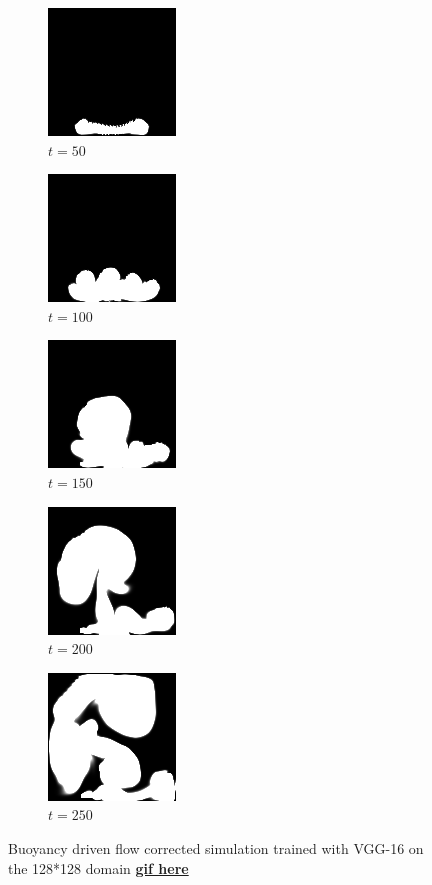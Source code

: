 \documentclass[a4paper,12pt,twoside]{report}
\begin{document}
\begin{figure}
	\centering
	\begin{subfigure}{0.18\textwidth}
		\centering
		\includegraphics[scale=0.56]{buoyancy_test/dens_000050_vgg.png}
		\caption{$t=50$}
	\end{subfigure}
	\begin{subfigure}{0.18\textwidth}
		\centering
		\includegraphics[scale=0.56]{buoyancy_test/dens_000100_vgg.png}
		\caption{$t=100$}
	\end{subfigure}
	\begin{subfigure}{0.18\textwidth}
		\centering
		\includegraphics[scale=0.56]{buoyancy_test/dens_000150_vgg.png}
		\caption{$t=150$}
	\end{subfigure}
	\begin{subfigure}{0.18\textwidth}
		\centering
		\includegraphics[scale=0.56]{buoyancy_test/dens_000200_vgg.png}
		\caption{$t=200$}
	\end{subfigure}
	\begin{subfigure}{0.18\textwidth}
		\centering
		\includegraphics[scale=0.56]{buoyancy_test/dens_000249_vgg.png}
		\caption{$t=250$}
	\end{subfigure}
	\caption{Buoyancy driven flow corrected simulation trained with VGG-16 on the 128*128 domain \href{https://github.com/w191444052/sol-data/blob/master/buoyancy_high/vgg.gif}{\bf{gif here}}}
	\label{sol buoyancy high vgg}
\end{figure}
\end{document}
